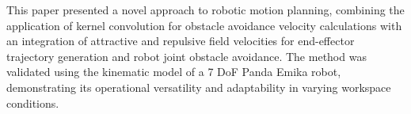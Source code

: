 \documentclass[a4paper]{article}
\begin{document}
%
%
%
%
%

This paper presented a novel approach to robotic motion planning, combining the application of kernel convolution for obstacle avoidance velocity calculations with an integration of attractive and repulsive field velocities for end-effector trajectory generation and robot joint obstacle avoidance. The method was validated using the kinematic model of a 7 DoF Panda Emika robot, demonstrating its operational versatility and adaptability in varying workspace conditions.
\end{document}

